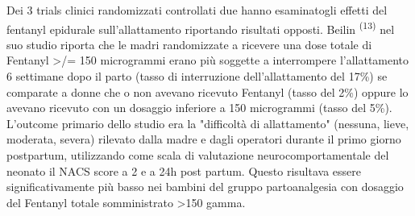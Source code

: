 \documentclass[]{article}
\begin{document}
Dei 3 trials clinici randomizzati controllati due hanno esaminatogli
effetti del fentanyl epidurale sull'allattamento riportando risultati
opposti. Beilin \textsuperscript{(13)} nel suo studio riporta che le
madri randomizzate a ricevere una dose totale di Fentanyl
\textgreater{}/= 150 microgrammi erano più soggette a interrompere
l'allattamento 6 settimane dopo il parto (tasso di interruzione
dell'allattamento del 17\%) se comparate a donne che o non avevano
ricevuto Fentanyl (tasso del 2\%) oppure lo avevano ricevuto con un
dosaggio inferiore a 150 microgrammi (tasso del 5\%). L'outcome primario
dello studio era la "difficoltà di allattamento" (nessuna, lieve,
moderata, severa) rilevato dalla madre e dagli operatori durante il
primo giorno postpartum, utilizzando come scala di valutazione
neurocomportamentale del neonato il NACS score a 2 e a 24h post partum.
Questo risultava essere significativamente più basso nei bambini del
gruppo partoanalgesia con dosaggio del Fentanyl totale somministrato
\textgreater{}150 gamma.
\end{document}
